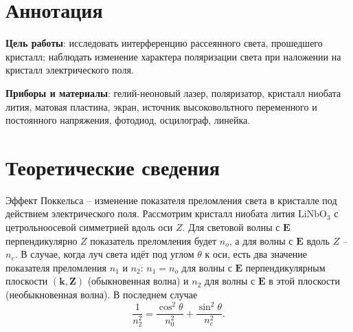 





\section{Аннотация}
\textbf{Цель работы}: исследовать интерференцию рассеянного света, прошедшего кристалл; наблюдать изменение характера поляризации света при наложении на кристалл электрического поля.

\textbf{Приборы и материалы}: гелий-неоновый лазер, поляризатор, кристалл ниобата лития, матовая пластина, экран, источник высоковольтного переменного и постоянного напряжения, фотодиод, осцилограф, линейка.


\section{Теоретические сведения}

Эффект Поккельса -- изменение показателя преломления света в кристалле под действием электрического поля.
Рассмотрим кристалл ниобата лития $\text{LiNbO}_3$ с цетрольноосевой симметрией вдоль оси $Z$. Для световой волны с $\mathbf{E}$ перпендикулярно $Z$ показатель преломления будет $n_o$, а для волны с $\mathbf{E}$ вдоль $Z$ -- $n_e$. В случае, когда луч света идёт под углом $\theta$ к оси, есть два значение показателя преломления $n_1$ и $n_2$: $n_1 = n_o$ для волны с $\mathbf{E}$ перпендикулярным плоскости $(\mathbf{k},\mathbf{Z})$ (обыкновенная волна) и $n_2$ для волны с $\mathbf{E}$ в этой плоскости (необыкновенная волна). В последнем случае
\begin{equation}
\dfrac{1}{n_2^2}=\dfrac{\cos^2 \theta}{n_0^2}+\dfrac{\sin^2 \theta}{n_e^2}.
\end{equation}

